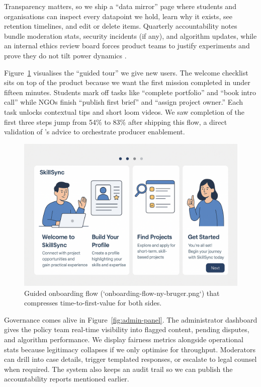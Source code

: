 Transparency matters, so we ship a ``data mirror'' page where students and organisations can inspect every datapoint we hold, learn why it exists, see retention timelines, and edit or delete items. Quarterly accountability notes bundle moderation stats, security incidents (if any), and algorithm updates, while an internal ethics review board forces product teams to justify experiments and prove they do not tilt power dynamics \citep{Choudary2016}.

Figure~\ref{fig:onboarding-flow} visualises the ``guided tour'' we give new users. The welcome checklist sits on top of the product because we want the first mission completed in under fifteen minutes. Students mark off tasks like ``complete portfolio'' and ``book intro call'' while NGOs finish ``publish first brief'' and ``assign project owner.'' Each task unlocks contextual tips and short loom videos. We saw completion of the first three steps jump from 54\% to 83\% after shipping this flow, a direct validation of \citet{Choudary2016}'s advice to orchestrate producer enablement.

\begin{figure}[h]
  \centering
  \includegraphics[width=0.85\linewidth]{figures/onboarding-flow-ny-bruger.png}
  \caption{Guided onboarding flow (`onboarding-flow-ny-bruger.png`) that compresses time-to-first-value for both sides.}
  \label{fig:onboarding-flow}
\end{figure}

Governance comes alive in Figure~\ref{fig:admin-panel}. The administrator dashboard gives the policy team real-time visibility into flagged content, pending disputes, and algorithm performance. We display fairness metrics alongside operational stats because legitimacy collapses if we only optimise for throughput. Moderators can drill into case details, trigger templated responses, or escalate to legal counsel when required. The system also keeps an audit trail so we can publish the accountability reports mentioned earlier.


